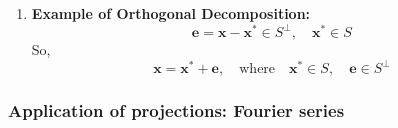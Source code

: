 \begin{derivation}
\begin{enumerate}
            \item \textbf{Example of Orthogonal Decomposition:}
            \[
            \mathbf{e} = \mathbf{x} - \mathbf{x}^* \in S^\perp, \quad \mathbf{x}^* \in S
            \]
            So, 
            \[
            \mathbf{x} = \mathbf{x}^* + \mathbf{e}, \quad \text{where} \quad \mathbf{x}^* \in S, \quad \mathbf{e} \in S^\perp
            \]
        \end{enumerate}


        \end{derivation}

    \subsubsection{Application of projections: Fourier series}
